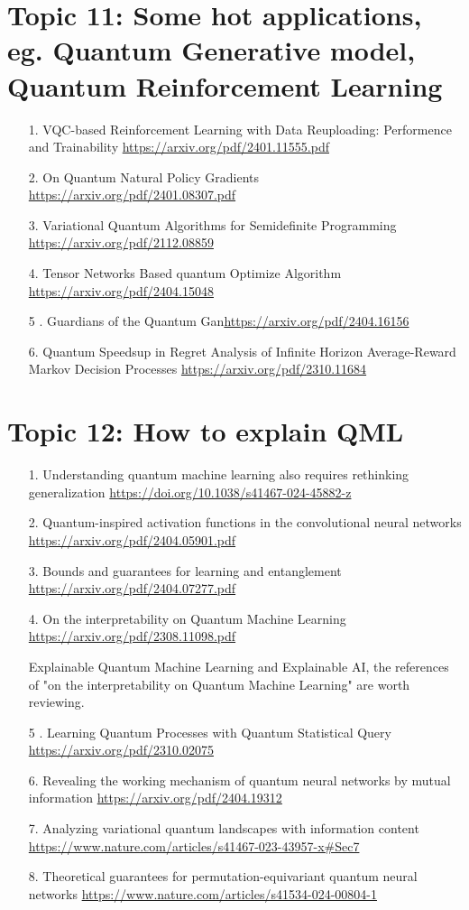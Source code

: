 \documentclass[12pt, oneside]{article}   	%
\begin{document}
\section{Topic 11: Some hot applications, eg. Quantum Generative model, Quantum  Reinforcement Learning}
\begin{itemize}
\item[1. ] VQC-based Reinforcement Learning with Data Reuploading: Performence and Trainability  \url{https://arxiv.org/pdf/2401.11555.pdf}
\item [2. ] On  Quantum Natural Policy Gradients \url{https://arxiv.org/pdf/2401.08307.pdf}
\item [3. ] Variational Quantum Algorithms for Semidefinite Programming \url{https://arxiv.org/pdf/2112.08859}
\item[4. ] Tensor Networks Based quantum Optimize Algorithm \url{https://arxiv.org/pdf/2404.15048}
\item[5 .] Guardians of the Quantum Gan\url{https://arxiv.org/pdf/2404.16156}
\item[6. ] Quantum Speedsup in Regret Analysis of Infinite Horizon Average-Reward Markov Decision Processes \url{https://arxiv.org/pdf/2310.11684} 
\end{itemize}
\section{Topic 12: How to explain QML}
\begin{itemize}
\item[1. ] Understanding quantum machine learning also requires rethinking generalization \url{https://doi.org/10.1038/s41467-024-45882-z}
\item[2. ] Quantum-inspired activation functions in the convolutional neural networks \url{https://arxiv.org/pdf/2404.05901.pdf}
\item[3. ] Bounds and guarantees for learning and entanglement \url{https://arxiv.org/pdf/2404.07277.pdf}
\item[4. ] On the interpretability on Quantum Machine Learning \url{https://arxiv.org/pdf/2308.11098.pdf} 
\par Explainable Quantum Machine Learning and Explainable AI, the references of "on the interpretability on Quantum Machine Learning" are worth reviewing.
\item[5 .] Learning Quantum Processes with Quantum Statistical Query \url{https://arxiv.org/pdf/2310.02075}
\item[6. ] Revealing the working mechanism of quantum neural networks by mutual information \url{https://arxiv.org/pdf/2404.19312}
\item[7. ] Analyzing variational quantum landscapes with information content \url{https://www.nature.com/articles/s41467-023-43957-x#Sec7}
\item[8. ] Theoretical guarantees for permutation-equivariant quantum neural networks \url{https://www.nature.com/articles/s41534-024-00804-1}
\end{itemize}
\end{document}
